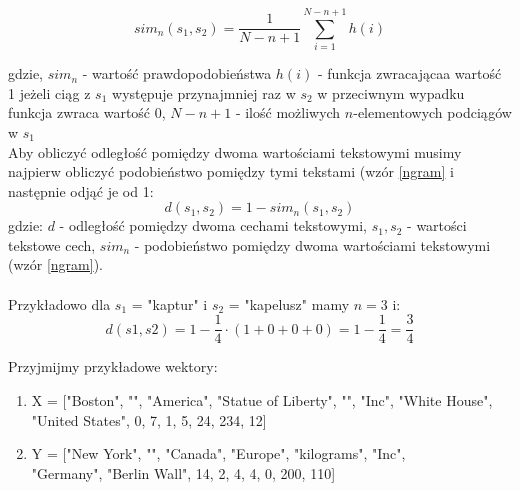\documentclass{classrep}
\begin{document}
\begin{equation}\label{ngram}
        sim_n(s_1,s_2) = \frac{1}{N-n+1} \sum_{i=1}^{N-n+1}h(i)
\end{equation}

gdzie, $sim_n$ - wartość prawdopodobieństwa $h(i)$ - funkcja zwracającaa wartość 1 jeżeli ciąg z $s_1$ występuje przynajmniej raz w $s_2$ w przeciwnym wypadku funkcja zwraca wartość 0, $N-n+1$ - ilość możliwych $n$-elementowych podciągów w $s_1$\\

Aby obliczyć odległość pomiędzy dwoma wartościami tekstowymi musimy najpierw obliczyć podobieństwo pomiędzy tymi tekstami (wzór \ref{ngram} i następnie odjąć je od 1:
\begin{equation}\label{tekstDist}
        d(s_1,s_2) = 1 - sim_n(s_1,s_2)
\end{equation}
gdzie: $d$ - odległość pomiędzy dwoma cechami tekstowymi, $s_1, s_2$ - wartości tekstowe cech, $sim_n$ - podobieństwo pomiędzy dwoma wartościami tekstowymi (wzór \ref{ngram}).\\\\
Przykładowo dla $s_1$ = "kaptur" i $s_2$ = "kapelusz" mamy $n = 3$ i:
\begin{equation}\label{dsimExample}
    d(s1, s2) = 1 - \frac{1}{4} \cdot (1 + 0 + 0 + 0) = 1 - \frac{1}{4} = \frac{3}{4}
\end{equation}

\newpage

Przyjmijmy przykładowe wektory:\\
\begin{enumerate}
    \item X = ["Boston", "", "America", "Statue of Liberty", "", "Inc", "White House", "United States", 0, 7, 1, 5, 24, 234, 12]
    \item Y = ["New York", "", "Canada", "Europe", "kilograms", "Inc", \\"Germany", "Berlin Wall", 14, 2, 4, 4, 0, 200, 110]
\end{enumerate}\leavevmode\newline
\end{document}
